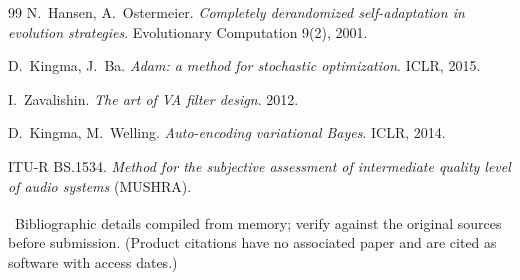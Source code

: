 \documentclass[11pt]{article}
\begin{document}
\begin{thebibliography}{99}
 N.~Hansen, A.~Ostermeier. \emph{Completely derandomized
  self-adaptation in evolution strategies}. Evolutionary Computation 9(2), 2001.

 D.~Kingma, J.~Ba. \emph{Adam: a method for stochastic
  optimization}. ICLR, 2015.

 I.~Zavalishin. \emph{The art of VA filter design}. 2012.

 D.~Kingma, M.~Welling. \emph{Auto-encoding variational Bayes}.
  ICLR, 2014.

 ITU-R BS.1534. \emph{Method for the subjective assessment of
  intermediate quality level of audio systems} (MUSHRA).

\end{thebibliography}

\vspace{0.6em}
\noindent\footnotesize\textsuperscript{\dag}~Bibliographic details compiled from
memory; verify against the original sources before submission. (Product
citations have no associated paper and are cited as software with access dates.)
\end{document}
